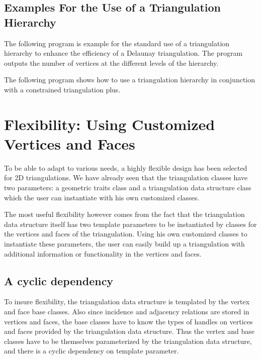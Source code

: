 \subsection{Examples For the Use of a  Triangulation Hierarchy\label{Subsection_2D_Triangulations_Hierarchy_Examples}}

The following program is example
for the  standard use of a  triangulation hierarchy
to enhance the efficiency
of a Delaunay triangulation. The program outputs the number of vertices
at the different levels of the hierarchy.

The following program shows how to use
a triangulation hierarchy in conjunction with a constrained 
triangulation plus.

\section{Flexibility: Using  Customized Vertices and Faces\label{Section_2D_Triangulations_Flexibility}}


To be able to adapt to  various needs, a highly
flexible design has been  selected for 2D triangulations.
We have already seen that
the triangulation classes have two
parameters: a geometric traits class
and a triangulation data structure  class
which the user can instantiate with his own customized classes.

The most useful flexibility however comes from the fact
that the triangulation data structure itself has two template
parameters to be instantiated by 
classes for the vertices and faces of the triangulation.
Using his own customized classes to instantiate these
parameters, the user can easily build up  a triangulation with additional
information or functionality in the vertices and faces.

\subsection*{A cyclic dependency}

To insure flexibility, the triangulation data structure is templated by the
vertex and face base classes. Also since incidence and adjacency
relations are stored in vertices and faces, the base classes have to
know the types of handles on vertices and faces provided
by the triangulation data structure. Thus the vertex and base
classes have to be themselves parameterized by the triangulation data
structure, and there is a cyclic dependency on template parameter.

